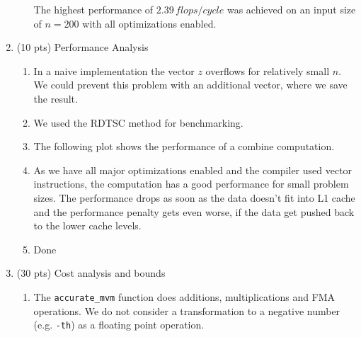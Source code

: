\documentclass[a4paper]{article}
\begin{document}
\begin{enumerate}
\begin{enumerate}
        The highest performance of $2.39 \, flops/cycle$ was achieved on an input size of $n=200$ with all optimizations enabled.
    \end{enumerate}
    
    \item (10 pts) Performance Analysis
    \begin{enumerate}
        \item In a naive implementation the vector $z$ overflows for relatively small $n$. We could prevent this problem with an additional vector, where we save the result.   
        \item We used the RDTSC method for benchmarking.
        \item The following plot shows the performance of a combine computation. 
        
        \begin{center}
        \end{center}
        
        \item As we have all major optimizations enabled and the compiler used vector instructions, the computation has a good performance for small problem sizes. The performance drops as soon as the data doesn't fit into L1 cache and the performance penalty gets even worse, if the data get pushed back to the lower cache levels.
        \item Done
    \end{enumerate}
    
    \item (30 pts) Cost analysis and bounds
    \begin{enumerate}
        \item The \verb$accurate_mvm$ function does additions, multiplications and FMA operations. We do not consider a transformation to a negative number (e.g. \verb$-th$) as a floating point operation.
        

\end{enumerate}
\end{enumerate}
\end{document}
